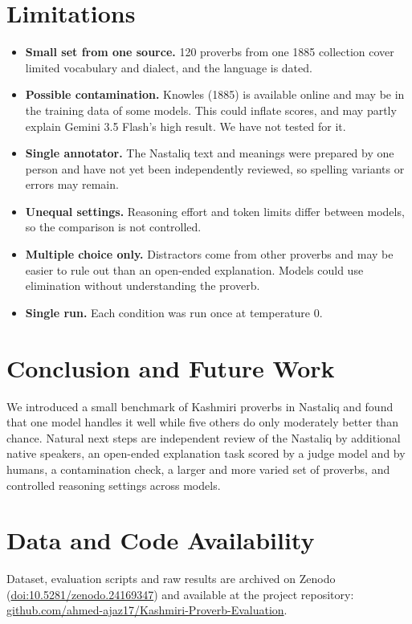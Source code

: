 \documentclass[11pt]{article}
\begin{document}
\section{Limitations}
\begin{itemize}
\item \textbf{Small set from one source.} 120 proverbs from one 1885 collection cover limited vocabulary and dialect, and the language is dated.
\item \textbf{Possible contamination.} Knowles (1885) is available online and may be in the training data of some models. This could inflate scores, and may partly explain Gemini 3.5 Flash's high result. We have not tested for it.
\item \textbf{Single annotator.} The Nastaliq text and meanings were prepared by one person and have not yet been independently reviewed, so spelling variants or errors may remain.
\item \textbf{Unequal settings.} Reasoning effort and token limits differ between models, so the comparison is not controlled.
\item \textbf{Multiple choice only.} Distractors come from other proverbs and may be easier to rule out than an open-ended explanation. Models could use elimination without understanding the proverb.
\item \textbf{Single run.} Each condition was run once at temperature 0.
\end{itemize}

\section{Conclusion and Future Work}
We introduced a small benchmark of Kashmiri proverbs in Nastaliq and found that one model handles it well while five others do only moderately better than chance. Natural next steps are independent review of the Nastaliq by additional native speakers, an open-ended explanation task scored by a judge model and by humans, a contamination check, a larger and more varied set of proverbs, and controlled reasoning settings across models.

\section*{Data and Code Availability}
Dataset, evaluation scripts and raw results are archived on Zenodo (\href{https://doi.org/10.5281/zenodo.24169347}{doi:10.5281/zenodo.24169347}) and available at the project repository: \href{https://github.com/ahmed-ajaz17/Kashmiri-Proverb-Evaluation}{github.com/ahmed-ajaz17/Kashmiri-Proverb-Evaluation}.
\end{document}
